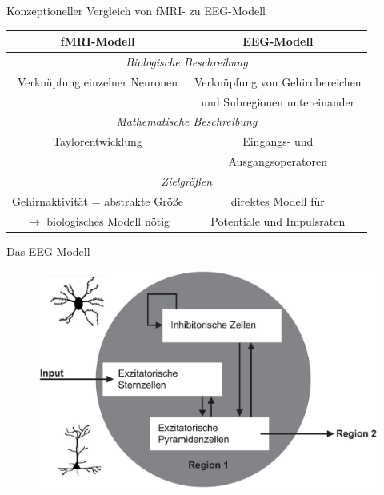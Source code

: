 \documentclass{beamer}
\begin{document}
\begin{frame}{Konzeptioneller Vergleich von fMRI- zu EEG-Modell}
\hspace*{-0.03 \textwidth}
\begin{tabular}{| c | c |}
\hline
\textbf{fMRI-Modell} & \textbf{EEG-Modell} \\
\hline
\multicolumn{2}{c}{\textit{Biologische Beschreibung}} \\
\hline
Verknüpfung einzelner Neuronen & Verknüpfung von Gehirnbereichen \\
&  und Subregionen untereinander \\
\hline
\multicolumn{2}{c}{\textit{Mathematische Beschreibung}} \\
\hline
Taylorentwicklung & Eingangs- und \\
&  Ausgangsoperatoren \\
\hline
\multicolumn{2}{c}{\textit{Zielgrößen}} \\
\hline
Gehirnaktivität = abstrakte Größe & direktes Modell für \\
$\rightarrow$ biologisches Modell nötig & Potentiale und Impulsraten\\
\hline
\end{tabular}
\end{frame}

\begin{frame}{Das EEG-Modell}
\begin{figure}
\centering
\includegraphics[scale=0.4]{res/160711EEGModell1.eps}
\end{figure}
\end{frame}
\end{document}
